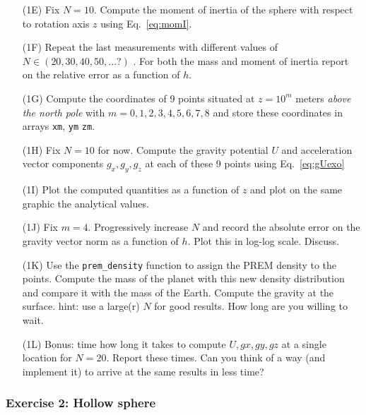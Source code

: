 \begin{itemize}
\item[(1E)] Fix $N=10$. Compute the moment of inertia of the sphere 
with respect to rotation axis $z$ using Eq.~\eqref{eq:momI}. 


\item[(1F)] Repeat the last measurements with different values of $N\in(20,30,40,50,...?)$ .
For both the mass and moment of inertia report on the relative error as a function of $h$.

\item[(1G)] Compute the coordinates of 9 points situated at $z=10^m$ meters 
{\it above the north pole} with $m=0,1,2,3,4,5,6,7,8$ and 
store these coordinates in arrays {\tt xm}, {\tt ym} {\tt zm}. 

\item[(1H)] Fix $N=10$ for now. Compute the gravity potential $U$ and acceleration vector 
components $g_x,g_y,g_z$ at each of these 9 points using Eq.~\eqref{eq:gUexo} 
 
\item[(1I)] Plot the computed quantities as a function of $z$ and plot on 
the same graphic the analytical values. 

\item[(1J)] Fix $m=4$. Progressively increase $N$ and record the absolute error on the gravity vector norm 
as a function of $h$. Plot this in log-log scale. Discuss.

\item[(1K)] Use the {\tt prem\_density} function to assign the PREM \cite{dzan81} density to the points. 
Compute the mass of the planet with this 
new density distribution and compare it with the mass of the Earth. Compute the gravity at the surface.
hint: use a large(r) $N$ for good results. How long are you willing to wait. 

\item[(1L)] Bonus: time how long it takes to compute $U,gx,gy,gz$ at a single location for $N=20$. Report these times. 
Can you think of a way (and implement it) to arrive at the same results in less time?  

\end{itemize}

\subsubsection*{Exercise 2: Hollow sphere}

